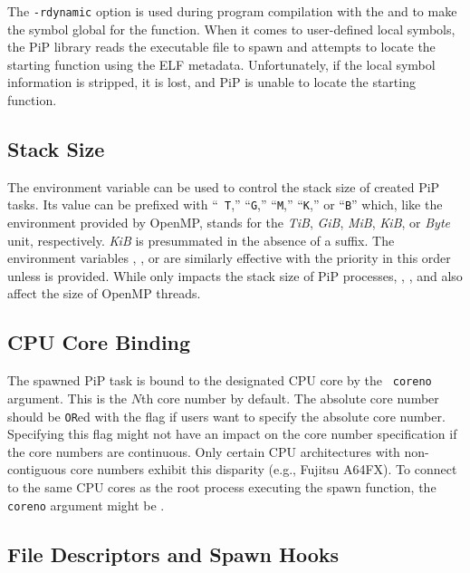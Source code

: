 The {\tt -rdynamic} option is used during program compilation with the
 and  to make the symbol global for the
{\main} function. When it comes to user-defined local symbols, the PiP
library reads the executable file to spawn and attempts to locate the
starting function using the ELF metadata. Unfortunately, if the local
symbol information is stripped, it is lost, and PiP is unable to
locate the starting function.

\subsection{Stack Size}

The  environment variable can be used to control the
stack size of created PiP tasks. Its value can be prefixed with ``{\tt
  T},'' ``{\tt G},'' ``{\tt M},'' ``{\tt K},'' or ``{\tt B}'' which,
like the  environment 
provided by OpenMP, stands for the {\it TiB}, {\it GiB}, {\it MiB}, {\it
  KiB}, or {\it Byte} unit,
respectively. {\it KiB} is presummated in the absence of a suffix. The
environment variables ,
, or  
are similarly effective with the priority in this order unless
 is provided. While  only
impacts the stack size of PiP processes, ,
, and   
also affect the size of OpenMP threads.

\subsection{CPU Core Binding}

The spawned PiP task is bound to the designated CPU core by the {\tt
  coreno} argument. This is the $N$th core number by default. The
absolute core number should be {\tt OR}ed with the
 flag if users want to specify the absolute
core number. Specifying this flag might not have 
an impact on the core number specification if the core numbers are
continuous. Only certain CPU architectures with non-contiguous core
numbers exhibit this disparity (e.g., Fujitsu A64FX). To connect to
the same CPU cores as the root process executing the spawn function,
the {\tt coreno} argument might be .

\subsection{File Descriptors and Spawn Hooks}\label{sec:hooks}

